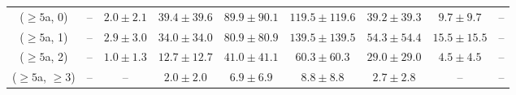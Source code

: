 \begin{table}[h!]
{\begin{tabular}{ccccccccc}
	($\ge5$a, 0) & -- & $2.0\pm 2.1$ & $39.4\pm 39.6$ & $89.9\pm 90.1$ & $119.5\pm 119.6$ & $39.2\pm 39.3$ & $9.7\pm 9.7$ & -- \\[0.5ex] 
	($\ge5$a, 1) & -- & $2.9\pm 3.0$ & $34.0\pm 34.0$ & $80.9\pm 80.9$ & $139.5\pm 139.5$ & $54.3\pm 54.4$ & $15.5\pm 15.5$ & -- \\[0.5ex] 
	($\ge5$a, 2) & -- & $1.0\pm 1.3$ & $12.7\pm 12.7$ & $41.0\pm 41.1$ & $60.3\pm 60.3$ & $29.0\pm 29.0$ & $4.5\pm 4.5$ & -- \\[0.5ex] 
	($\ge5$a, $\ge3$) & -- & -- & $2.0\pm 2.0$ & $6.9\pm 6.9$ & $8.8\pm 8.8$ & $2.7\pm 2.8$ & -- & -- \\[0.5ex] 
	\hline
	\hline
\end{tabular}}
\end{table}
